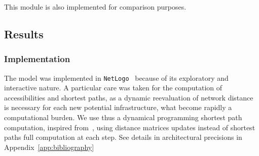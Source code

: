 This module is also implemented for comparison purposes.


\subsection{Results}


\subsubsection{Implementation}

The model was implemented in \texttt{NetLogo}~\cite{wilensky1999netlogo} because of its exploratory and interactive nature. A particular care was taken for the computation of accessibilities and shortest paths, as a dynamic reevaluation of network distance is necessary for each new potential infrastructure, what become rapidly a computational burden. We use thus a dynamical programming shortest path computation, inspired from~\cite{tretyakov2011fast}, using distance matrices updates instead of shortest paths full computation at each step. See details in architectural precisions in Appendix~\ref{app:bibliography}


